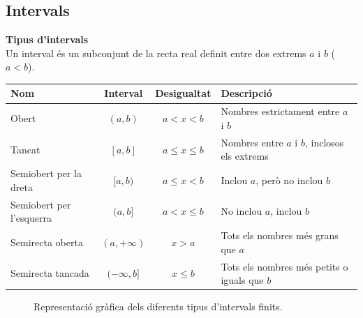 \documentclass[12pt]{article}
\begin{document}
\subsection{Intervals}

\begin{concept}
\textbf{Tipus d'intervals}\\
Un interval és un subconjunt de la recta real definit entre dos extrems $a$ i $b$ ($a < b$).

\begin{table}[H]
\centering
\small
\setlength{\tabcolsep}{4pt}
\begin{tabularx}{\textwidth}{|l|c|c|X|}
\hline
\textbf{Nom} & \textbf{Interval} & \textbf{Desigualtat} & \textbf{Descripció} \\ \hline
Obert & $(a,b)$ & $a < x < b$ & Nombres estrictament entre $a$ i $b$ \\ \hline
Tancat & $[a,b]$ & $a \le x \le b$ & Nombres entre $a$ i $b$, inclosos els extrems \\ \hline
Semiobert per la dreta & $[a,b)$ & $a \le x < b$ & Inclou $a$, però no inclou $b$ \\ \hline
Semiobert per l'esquerra & $(a,b]$ & $a < x \le b$ & No inclou $a$, inclou $b$ \\ \hline
Semirecta oberta & $(a, +\infty)$ & $x > a$ & Tots els nombres més grans que $a$ \\ \hline
Semirecta tancada & $(-\infty, b]$ & $x \le b$ & Tots els nombres més petits o iguals que $b$ \\ \hline
\end{tabularx}
\end{table}

\begin{figure}[H]
\centering
{}
\caption{Representació gràfica dels diferents tipus d'intervals finits.}
\end{figure}
\end{concept}
\end{document}
